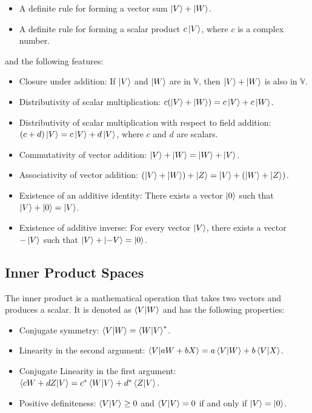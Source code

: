 \documentclass[12pt,a4paper]{report}
\newcommand{\vecspace}[1]{\mathbb{#1}}
\begin{document}
\begin{itemize}
    \item A definite rule for forming a vector sum $\ket{V} + \ket{W}$.
    \item A definite rule for forming a scalar product $c\ket{V}$, where $c$ is a complex number.
\end{itemize}
and the following features:
\begin{itemize}
    \item Closure under addition: If $\ket{V}$ and $\ket{W}$ are in $\vecspace{V}$, then $\ket{V} + \ket{W}$ is also in $\vecspace{V}$.
    \item Distributivity of scalar multiplication: $c(\ket{V} + \ket{W}) = c\ket{V} + c\ket{W}$.
    \item Distributivity of scalar multiplication with respect to field addition: $(c + d)\ket{V} = c\ket{V} + d\ket{V}$, where $c$ and $d$ are scalars.
    \item Commutativity of vector addition: $\ket{V} + \ket{W} = \ket{W} + \ket{V}$.
    \item Associativity of vector addition: $(\ket{V} + \ket{W}) + \ket{Z} = \ket{V} + (\ket{W} + \ket{Z})$.
    \item Existence of an additive identity: There exists a vector $\ket{0}$ such that $\ket{V} + \ket{0} = \ket{V}$.
    \item Existence of additive inverse: For every vector $\ket{V}$, there exists a vector $-\ket{V}$ such that $\ket{V} + \ket{-V} = \ket{0}$.
\end{itemize}

\subsection{Inner Product Spaces}

The inner product is a mathematical operation that takes two vectors and produces a scalar. It is denoted as $\bra{V}\ket{W}$ and has the following properties:
\begin{itemize}
    \item Conjugate symmetry: $\bra{V}\ket{W} = \bra{W}\ket{V}^*$.
    \item Linearity in the second argument: $\bra{V}\ket{aW + bX} = a\bra{V}\ket{W} + b\bra{V}\ket{X}$.
    \item Conjugate Linearity in the first argument: $\bra{cW + dZ}\ket{V} = c^*\bra{W}\ket{V} + d^*\bra{Z}\ket{V}$.
    \item Positive definiteness: $\bra{V}\ket{V} \geq 0$ and $\bra{V}\ket{V} = 0$ if and only if $\ket{V} = \ket{0}$.
\end{itemize}
\end{document}
